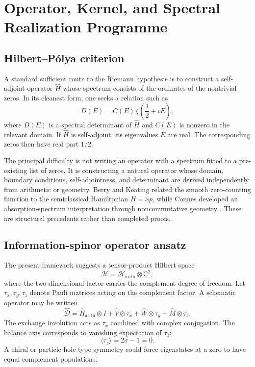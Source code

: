 \chapter{Operator, Kernel, and Spectral Realization Programme}
\label{ch:operator}

\section{Hilbert--Pólya criterion}
A standard sufficient route to the Riemann hypothesis is to construct a self-adjoint operator $\widehat H$ whose spectrum consists of the ordinates of the nontrivial zeros. In its cleanest form, one seeks a relation such as
\begin{equation}
D(E)=C(E)\,\xi\!\left(\frac12+iE\right),
\label{eq:spectral-det}
\end{equation}
where $D(E)$ is a spectral determinant of $\widehat H$ and $C(E)$ is nonzero in the relevant domain. If $\widehat H$ is self-adjoint, its eigenvalues $E$ are real. The corresponding zeros then have real part $1/2$.

The principal difficulty is not writing an operator with a spectrum fitted to a pre-existing list of zeros. It is constructing a natural operator whose domain, boundary conditions, self-adjointness, and determinant are derived independently from arithmetic or geometry. Berry and Keating related the smooth zero-counting function to the semiclassical Hamiltonian $H=xp$, while Connes developed an absorption-spectrum interpretation through noncommutative geometry \cite{BerryKeating1999,Connes1999}. These are structural precedents rather than completed proofs.

\section{Information-spinor operator ansatz}
The present framework suggests a tensor-product Hilbert space
\begin{equation}
\mathcal H=\mathcal H_{\mathrm{arith}}\otimes\mathbb C^2,
\end{equation}
where the two-dimensional factor carries the complement degree of freedom. Let $\tau_x,\tau_y,\tau_z$ denote Pauli matrices acting on the complement factor. A schematic operator may be written
\begin{equation}
\widehat{\mathcal D}
=\widehat H_{\mathrm{arith}}\otimes I
+\widehat V\otimes\tau_x
+\widehat W\otimes\tau_y
+\widehat M\otimes\tau_z.
\label{eq:dirac-ansatz}
\end{equation}
The exchange involution acts as $\tau_x$ combined with complex conjugation. The balance axis corresponds to vanishing expectation of $\tau_z$:
\begin{equation}
\langle\tau_z\rangle=2\sigma-1=0.
\end{equation}
A chiral or particle-hole type symmetry could force eigenstates at a zero to have equal complement populations.

